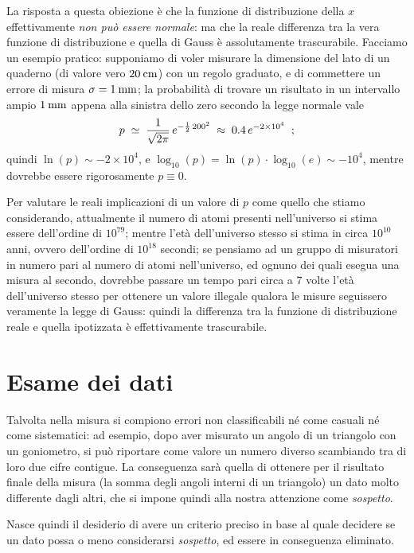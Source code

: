 La risposta a questa obiezione \`e che la funzione di
distribuzione della $x$ effettivamente \emph{non pu\`o
  essere normale}: ma che la reale differenza tra la vera
funzione di distribuzione e quella di Gauss \`e
assolutamente trascurabile.  Facciamo un esempio pratico:
supponiamo di voler misurare la dimensione del lato di un
quaderno (di valore vero $20\un{cm}$) con un regolo graduato,
e di commettere un errore di misura $\sigma = 1\un{mm}$; la
probabilit\`a di trovare un risultato in un intervallo ampio
$1\un{mm}$ appena alla sinistra dello zero secondo la legge
normale vale
\begin{equation*}
  p \; \simeq \; \frac{1}{\sqrt{2 \pi}} \, e^{- \frac{1}{2}
    \, 200^2} \; \approx \; 0.4 \, e^{-2 \times 10^4} \;\; ;
\end{equation*}
quindi $\ln(p) \sim -2 \times 10^4$, e $\log_{10} (p) =
\ln(p) \cdot \log_{10} (e) \sim -10^4$, mentre dovrebbe
essere rigorosamente $p \equiv 0$.

Per valutare le reali implicazioni di un valore di $p$ come
quello che stiamo considerando, attualmente il numero di
atomi presenti nell'universo si stima essere dell'ordine di
$10^{79}$; mentre l'et\`a dell'universo stesso si stima in
circa $10^{10}$ anni, ovvero dell'ordine di $10^{18}$
secondi; se pensiamo ad un gruppo di misuratori in numero
pari al numero di atomi nell'universo, ed ognuno dei quali
esegua una misura al secondo, dovrebbe passare un tempo pari
circa a 7 volte l'et\`a dell'universo stesso per ottenere un
valore illegale qualora le misure seguissero veramente la
legge di Gauss: quindi la differenza tra la funzione di
distribuzione reale e quella ipotizzata \`e effettivamente
trascurabile.

\section{Esame dei dati}%
Talvolta nella misura si compiono errori non classificabili
n\'e come casuali n\'e come sistematici: ad esempio, dopo
aver misurato un angolo di un triangolo con un goniometro,
si pu\`o riportare come valore un numero diverso scambiando
tra di loro due cifre contigue.  La conseguenza sar\`a
quella di ottenere per il risultato finale della misura (la
somma degli angoli interni di un triangolo) un dato molto
differente dagli altri, che si impone quindi alla nostra
attenzione come \emph{sospetto}.

Nasce quindi il desiderio di avere un criterio preciso in
base al quale decidere se un dato possa o meno considerarsi
\emph{sospetto}, ed essere in conseguenza eliminato.

